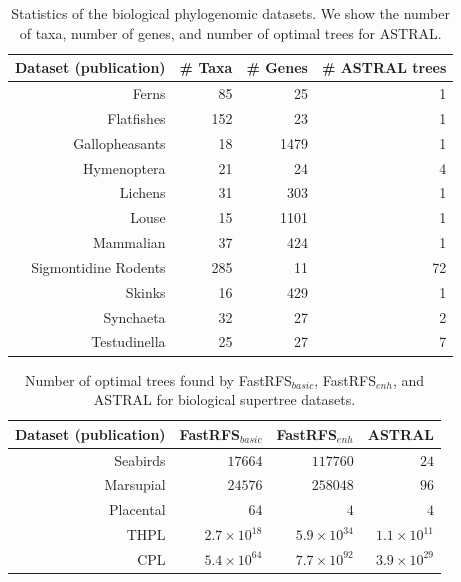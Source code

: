\begin{table}
\centering
\caption[Statistics of the biological phylogenomic
  datasets for SIESTA study]{Statistics of the biological phylogenomic
  datasets. We show the number of taxa, number of genes, and number of optimal trees for ASTRAL.} 
  \label{siesta::table:bio-phylogenomic}
\begin{tabular}{|r|r|r|r|}
  \hline
  Dataset (publication) & \# Taxa & \# Genes & \# ASTRAL trees \\
  \hline
  Ferns \cite{rothfels2015evolutionary} &85 & 25 & 1 \\
  Flatfishes \cite{betancur2014molecular} & 152 & 23 & 1 \\
  Gallopheasants \cite{meiklejohn2016analysis} & 18 & 1479 & 1 \\
  Hymenoptera \cite{sharanowski2010expressed} & 21 & 24 & 4 \\
  Lichens \cite{leavitt2016resolving} & 31 & 303 & 1 \\
  Louse \cite{allen2017phylogenomics} & 15 & 1101 & 1 \\
  Mammalian \cite{Song2012} & 37 & 424 & 1 \\
  Sigmontidine Rodents \cite{maestri2017ecology} & 285 & 11 & 72 \\
  Skinks \cite{linkem2016detecting} & 16 & 429 & 1 \\
  Synchaeta \cite{tang2014effects} & 32 & 27 & 2 \\
  Testudinella \cite{tang2014effects} & 25 & 27 & 7 \\
  \hline
\end{tabular}
\end{table}

\begin{table}
\caption{Number of optimal trees found by FastRFS$_{basic}$, FastRFS$_{enh}$, and ASTRAL  for biological supertree
  datasets. } \label{siesta::table:supertree_counts}
\begin{tabular}{|r|r|r|r|}
\hline
Dataset (publication) & FastRFS$_{basic}$ & FastRFS$_{enh}$ & ASTRAL \\
\hline
Seabirds \cite{kennedy2002seabird} & $17664$ & $117760$  & $24$  \\
Marsupial \cite{marsupial} & $24576$ & $258048$  &$96$ \\
Placental \cite{placental}& $64$ & $4$ & $4$\\
THPL \cite{THPL}& $2.7\times 10^{18}$ & $5.9 \times 10^{34}$ & $1.1 \times 10^{11}$ \\
CPL \cite{cpl}& $5.4\times 10^{64}$  & $7.7 \times 10^{92}$ &  $3.9 \times 10^{29}$\\
\hline
\end{tabular}
\end{table}


